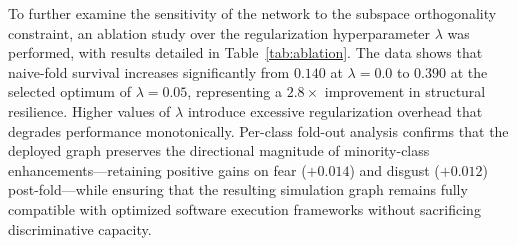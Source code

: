\documentclass[algorithms,article,submit,moreauthors]{Definitions/mdpi}
\begin{document}
\begin{table}[h!]
\centering
\caption{Recognition accuracy and macro-$F_1$ across graph variants on RAF-DB and FER2013 datasets.}
\label{tab:accuracy}
\end{table}

To further examine the sensitivity of the network to the subspace orthogonality constraint, an ablation study over the regularization hyperparameter $\lambda$ was performed, with results detailed in Table~\ref{tab:ablation}. The data shows that naive-fold survival increases significantly from $0.140$ at $\lambda = 0.0$ to $0.390$ at the selected optimum of $\lambda = 0.05$, representing a $2.8\times$ improvement in structural resilience. Higher values of $\lambda$ introduce excessive regularization overhead that degrades performance monotonically. Per-class fold-out analysis confirms that the deployed graph preserves the directional magnitude of minority-class enhancements—retaining positive gains on fear ($+0.014$) and disgust ($+0.012$) post-fold—while ensuring that the resulting simulation graph remains fully compatible with optimized software execution frameworks without sacrificing discriminative capacity.
\end{document}
